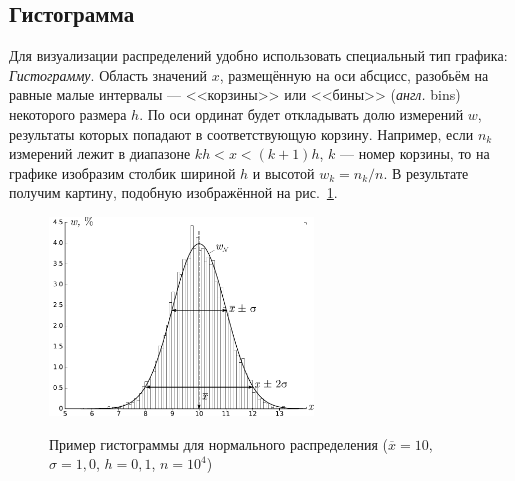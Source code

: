 \subsection{Гистограмма}

Для визуализации распределений удобно использовать специальный тип графика: \emph{Гистограмму}.
Область значений $x$, размещённую на оси абсцисс, разобьём на равные малые интервалы --- <<корзины>>
или <<бины>> (\emph{англ.} bins) некоторого
размера $h$. По оси ординат будет откладывать долю измерений $w$,
результаты которых попадают в соответствующую корзину. Например, если
$n_{k}$ измерений лежит в диапазоне $kh<x<(k+1)h$, $k$ ---
номер корзины, то на графике изобразим столбик шириной $h$ и высотой
$w_{k}=n_{k}/n$. В результате получим картину, подобную изображённой
на рис.~\ref{fig:normhist}. 

\begin{figure}
    \centering
    \includegraphics[width=7cm]{images/normhist.pdf}
    \label{fig:normhist}
    \caption{Пример гистограммы для нормального распределения ($\overline{x}=10$, $\sigma=1{,}0$, $h=0{,}1$, $n=10^{4}$)}
\end{figure}



